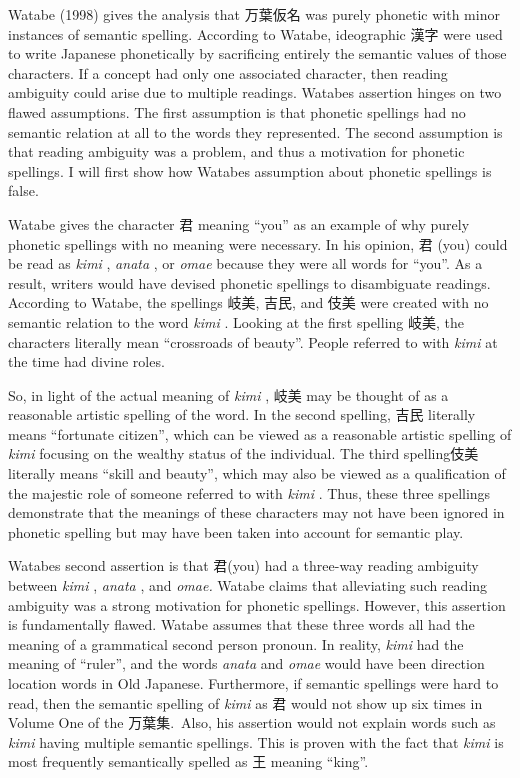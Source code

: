 \par{ Watabe (1998) gives the analysis that 万葉仮名 was purely phonetic with minor instances of semantic spelling. According to Watabe, ideographic 漢字 were used to write Japanese phonetically by sacrificing entirely the semantic values of those characters. If a concept had only one associated character, then reading ambiguity could arise due to multiple readings. Watabe\textquotesingle s assertion hinges on two flawed assumptions. The first assumption is that phonetic spellings had no semantic relation at all to the words they represented. The second assumption is that reading ambiguity was a problem, and thus a motivation for phonetic spellings. I will first show how Watabe\textquotesingle s assumption about phonetic spellings is false. }

\par{ Watabe gives the character 君 meaning “you” as an example of why purely phonetic spellings with no meaning were necessary. In his opinion, 君 (you) could be read as \emph{kimi }, \emph{anata }, or \emph{omae }because they were all words for “you”. As a result, writers would have devised phonetic spellings to disambiguate readings. According to Watabe, the spellings 岐美, 吉民, and 伎美 were created with no semantic relation to the word \emph{kimi }. Looking at the first spelling 岐美, the characters literally mean “crossroads of beauty”. People referred to with \emph{kimi }at the time had divine roles. }

\par{ So, in light of the actual meaning of \emph{kimi }, 岐美 may be thought of as a reasonable artistic spelling of the word. In the second spelling, 吉民 literally means “fortunate citizen”, which can be viewed as a reasonable artistic spelling of \emph{kimi }focusing on the wealthy status of the individual. The third spelling伎美 literally means “skill and beauty”, which may also be viewed as a qualification of the majestic role of someone referred to with \emph{kimi }. Thus, these three spellings demonstrate that the meanings of these characters may not have been ignored in phonetic spelling but may have been taken into account for semantic play. }

\par{ Watabe\textquotesingle s second assertion is that 君(you) had a three-way reading ambiguity between \emph{kimi }, \emph{anata }, and \emph{omae. }Watabe claims that alleviating such reading ambiguity was a strong motivation for phonetic spellings. However, this assertion is fundamentally flawed. Watabe assumes that these three words all had the meaning of a grammatical second person pronoun. In reality, \emph{kimi }had the meaning of “ruler”, and the words \emph{anata }and \emph{omae }would have been direction location words in Old Japanese. Furthermore, if semantic spellings were hard to read, then the semantic spelling of \emph{kimi }as 君 would not show up six times in Volume One of the 万葉集. Also, his assertion would not explain words such as \emph{kimi }having multiple semantic spellings. This is proven with the fact that \emph{kimi }is most frequently semantically spelled as 王 meaning “king”. }

